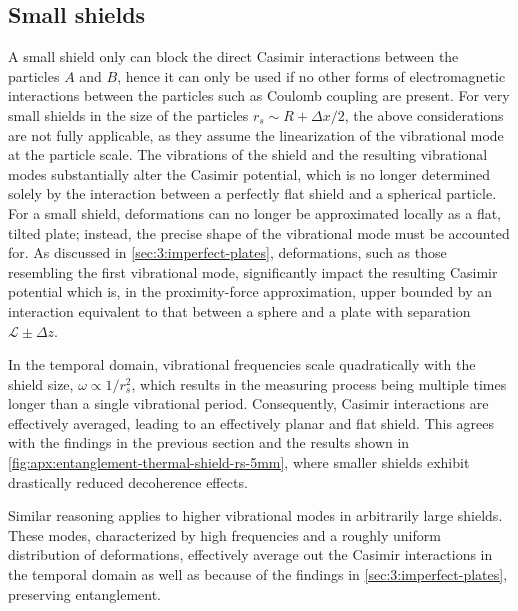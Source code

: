 \subsection{Small shields}
A small shield only can block the direct Casimir interactions between the particles $A$ and $B$, hence it can only be used if no other forms of electromagnetic interactions between the particles such as Coulomb coupling are present.
For very small shields in the size of the particles $r_s \sim R + \Delta x / 2$, the above considerations are not fully applicable, as they assume the linearization of the vibrational mode at the particle scale.
The vibrations of the shield and the resulting vibrational modes substantially alter the Casimir potential, which is no longer determined solely by the interaction between a perfectly flat shield and a spherical particle. 
For a small shield, deformations can no longer be approximated locally as a flat, tilted plate; instead, the precise shape of the vibrational mode must be accounted for. 
As discussed in \cref{sec:3:imperfect-plates}, deformations, such as those resembling the first vibrational mode, significantly impact the resulting Casimir potential which is, in the proximity-force approximation, upper bounded by an interaction equivalent to that between a sphere and a plate with separation $\mathscr{L} \pm \Delta z$.

In the temporal domain, vibrational frequencies scale quadratically with the shield size, $\omega \propto 1/r_s^2$, which results in the measuring process being multiple times longer than a single vibrational period. 
Consequently, Casimir interactions are effectively averaged, leading to an effectively planar and flat shield.
This agrees with the findings in the previous section and the results shown in \cref{fig:apx:entanglement-thermal-shield-rs-5mm}, where smaller shields exhibit drastically reduced decoherence effects.

Similar reasoning applies to higher vibrational modes in arbitrarily large shields. 
These modes, characterized by high frequencies and a roughly uniform  distribution of deformations, effectively average out the Casimir interactions in the temporal domain as well as because of the findings in \cref{sec:3:imperfect-plates}, preserving entanglement.
